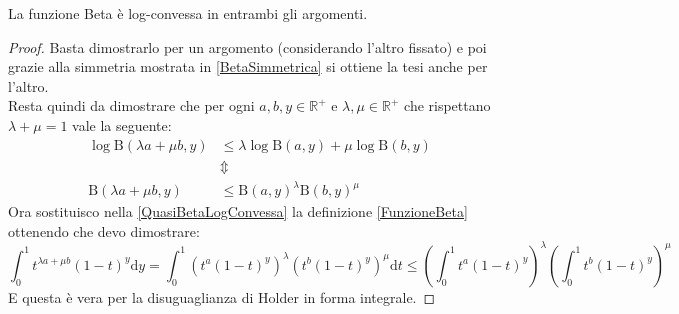 \begin{lemma}\label{BetaLogConvessa} 
	La funzione Beta è log-convessa in entrambi gli argomenti.
\end{lemma}
\begin{proof}
	Basta dimostrarlo per un argomento (considerando l'altro fissato) e poi grazie alla simmetria mostrata in \cref{BetaSimmetrica}
	si ottiene la tesi anche per l'altro.\\
	Resta quindi da dimostrare che per ogni $a,b,y\in\mathbb{R^+}$ e $\lambda,\mu\in\mathbb{R^+}$ che rispettano $\lambda+\mu=1$ vale la seguente:
	\begin{equation}\begin{split}\label{QuasiBetaLogConvessa}
		\log \mathrm{B}(\lambda a+\mu b, y )  & \le \lambda \log \mathrm{B}(a, y ) + \mu\log \mathrm{B}( b, y )\\
		& \Updownarrow  \\
		\mathrm{B}(\lambda a+\mu b, y ) & \le  \mathrm{B}(a,y)^{\lambda}\mathrm{B}(b, y )^{\mu}
	\end{split}\end{equation}
	Ora sostituisco nella \cref{QuasiBetaLogConvessa} la definizione \cref{FunzioneBeta} ottenendo che devo dimostrare:
	\begin{equation*}
		\int_{0}^1 t^{\lambda a+\mu b}(1-t)^y\mathrm{d}y=\int_{0}^1 \left(t^a(1-t)^y\right)^{\lambda}\left(t^b(1-t)^y\right)^{\mu}\mathrm{d}t \le
		\left(\int_{0}^1 t^a(1-t)^y\right)^{\lambda}\left(\int_{0}^1 t^b(1-t)^y\right)^{\mu}
	\end{equation*}
	E questa è vera per la disuguaglianza di Holder in forma integrale.

\end{proof}

